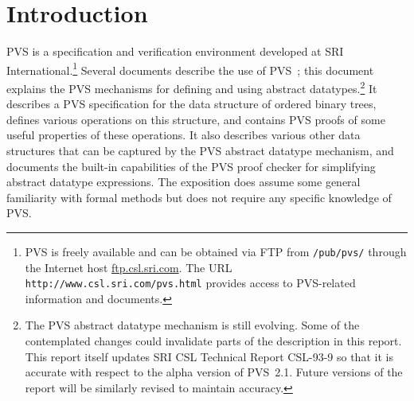 \documentclass[11pt,twoside]{book}
\begin{document}
\raggedbottom
%
\vspace{4in}
\tableofcontents

\cleardoublepage
{}
\setcounter{page}{1}

\chapter{Introduction}

PVS is a specification and verification environment developed at SRI
International.\footnote{PVS is freely available and can be obtained via
FTP from \texttt{/pub/pvs/} through the Internet host
\url{ftp.csl.sri.com}.  The URL \texttt{http://www.csl.sri.com/pvs.html}
provides access to PVS-related information and documents.}  Several
documents describe the use of PVS~\cite{PVS:manuals}; this document
explains the PVS mechanisms for defining and using abstract
datatypes.\footnote{The PVS abstract datatype mechanism is still evolving.
Some of the contemplated changes could invalidate parts of the description
in this report.  This report itself updates SRI CSL Technical Report
CSL-93-9 so that it is accurate with respect to the alpha version of
PVS~2.1\@.  Future versions of the report will be similarly revised to
maintain accuracy.}  It describes a PVS specification for the data
structure of ordered binary trees, defines various operations on this
structure, and contains PVS proofs of some useful properties of these
operations.  It also describes various other data structures that can be
captured by the PVS abstract datatype mechanism, and documents the
built-in capabilities of the PVS proof checker for simplifying abstract
datatype expressions.  The exposition does assume some general familiarity
with formal methods but does not require any specific knowledge of PVS\@.
\end{document}
